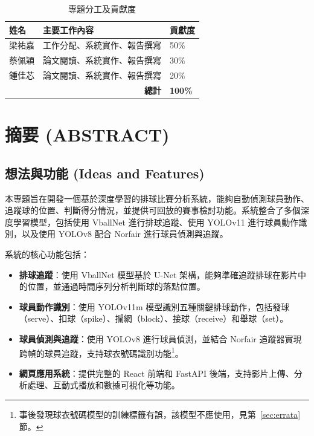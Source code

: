\documentclass[a4paper,14pt,oneside]{article}
\begin{document}
\begin{table}[H]
    \centering
    \caption{專題分工及貢獻度}
    \begin{tabular}{|p{2cm}|p{6cm}|p{2cm}|}
        \hline
        \textbf{姓名} & \textbf{主要工作內容} & \textbf{貢獻度} \\
        \hline
        梁祐嘉 & 工作分配、系統實作、報告撰寫 & 50\% \\
        \hline
        蔡佩穎 & 論文閱讀、系統實作、報告撰寫 & 30\% \\
        \hline
        鍾佳芯 & 論文閱讀、系統實作、報告撰寫 & 20\% \\
        \hline
        \multicolumn{2}{|r|}{\textbf{總計}} & \textbf{100\%} \\
        \hline
    \end{tabular}
\end{table}

\newpage
\tableofcontents
\newpage
\listoffigures
\newpage
\listoftables

\newpage
\section{摘要 (ABSTRACT)}

\subsection{想法與功能 (Ideas and Features)}
本專題旨在開發一個基於深度學習的排球比賽分析系統，能夠自動偵測球員動作、追蹤球的位置、判斷得分情況，並提供可回放的賽事檢討功能。系統整合了多個深度學習模型，包括使用 VballNet 進行排球追蹤、使用 YOLOv11 進行球員動作識別，以及使用 YOLOv8 配合 Norfair 進行球員偵測與追蹤。

系統的核心功能包括：
\begin{itemize}
    \item \textbf{排球追蹤}：使用 VballNet 模型基於 U-Net 架構，能夠準確追蹤排球在影片中的位置，並通過時間序列分析判斷球的落點位置。
    \item \textbf{球員動作識別}：使用 YOLOv11m 模型識別五種關鍵排球動作，包括發球（serve）、扣球（spike）、攔網（block）、接球（receive）和舉球（set）。
    \item \textbf{球員偵測與追蹤}：使用 YOLOv8 進行球員偵測，並結合 Norfair 追蹤器實現跨幀的球員追蹤，支持球衣號碼識別功能\footnote{事後發現球衣號碼模型的訓練標籤有誤，該模型不應使用，見第~\ref{sec:errata} 節。}。
    \item \textbf{網頁應用系統}：提供完整的 React 前端和 FastAPI 後端，支持影片上傳、分析處理、互動式播放和數據可視化等功能。
\end{itemize}
\end{document}
